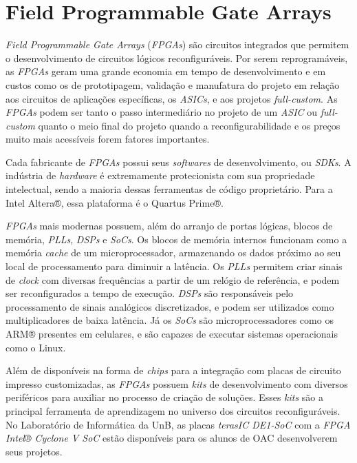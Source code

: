 \section{Field Programmable Gate Arrays}
{ \textit{Field Programmable Gate Arrays} (\textit{FPGAs}) são circuitos
    integrados que permitem o desenvolvimento de circuitos lógicos
    reconfiguráveis. Por serem reprogramáveis, as \textit{FPGAs} geram uma
    grande economia em tempo de desenvolvimento e em custos como os de
    prototipagem, validação e manufatura do projeto em relação aos circuitos de
    aplicações específicas, os \textit{ASICs}, e aos projetos
    \textit{full-custom}. As \textit{FPGAs} podem ser tanto o passo
    intermediário no projeto de um \textit{ASIC} ou \textit{full-custom} quanto
    o meio final do projeto quando a reconfigurabilidade e os preços muito mais
    acessíveis forem fatores importantes.
}

{ Cada fabricante de \textit{FPGAs} possui seus \textit{softwares} de
    desenvolvimento, ou \textit{SDKs}. A indústria de \textit{hardware} é
    extremamente protecionista com sua propriedade intelectual, sendo a maioria
    dessas ferramentas de código proprietário. Para a Intel Altera®, essa
    plataforma é o Quartus Prime®.
}

{ \textit{FPGAs} mais modernas possuem, além do arranjo de portas lógicas,
    blocos de memória, \textit{PLLs}, \textit{DSPs} e \textit{SoCs}. Os blocos
    de memória internos funcionam como a memória \textit{cache} de um
    microprocessador, armazenando os dados próximo ao seu local de
    processamento para diminuir a latência. Os \textit{PLLs} permitem criar
    sinais de \textit{clock} com diversas frequências a partir de um relógio de
    referência, e podem ser reconfigurados a tempo de execução. \textit{DSPs}
    são responsáveis pelo processamento de sinais analógicos discretizados, e
    podem ser utilizados como multiplicadores de baixa latência. Já os
    \textit{SoCs} são microprocessadores como os ARM® presentes em celulares,
    e são capazes de executar sistemas operacionais como o Linux.
}

{ Além de disponíveis na forma de \textit{chips} para a integração com placas
    de circuito impresso customizadas, as \textit{FPGAs} possuem \textit{kits}
    de desenvolvimento com diversos periféricos para auxiliar no processo de
    criação de soluções. Esses \textit{kits} são a principal ferramenta de
    aprendizagem no universo dos circuitos reconfiguráveis. No Laboratório de
    Informática da UnB, as placas \textit{terasIC DE1-SoC} com a \textit{FPGA
    Intel® Cyclone V SoC} estão disponíveis para os alunos de OAC desenvolverem
    seus projetos.
}


